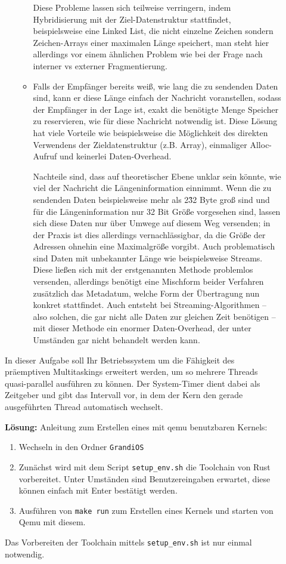\begin{description}
\begin{itemize}
\begin{itemize}
            Diese Probleme lassen sich teilweise verringern, indem Hybridisierung mit der Ziel-Datenstruktur stattfindet, beispielsweise eine Linked List, die nicht einzelne Zeichen sondern Zeichen-Arrays einer maximalen Länge speichert, man steht hier allerdings vor einem ähnlichen Problem wie bei der Frage nach interner vs externer Fragmentierung.
          \item Falls der Empfänger bereits weiß, wie lang die zu sendenden Daten sind, kann er diese Länge einfach der Nachricht voranstellen, sodass der Empfänger in der Lage ist, exakt die benötigte Menge Speicher zu reservieren, wie für diese Nachricht notwendig ist. Diese Lösung hat viele Vorteile wie beispielsweise die Möglichkeit des direkten Verwendens der Zieldatenstruktur (z.B. Array), einmaliger Alloc-Aufruf und keinerlei Daten-Overhead.

            Nachteile sind, dass auf theoretischer Ebene unklar sein könnte, wie viel der Nachricht die Längeninformation einnimmt. Wenn die zu sendenden Daten beispielsweise mehr als 2\^32 Byte groß sind und für die Längeninformation nur 32 Bit Größe vorgesehen sind, lassen sich diese Daten nur über Umwege auf diesem Weg versenden; in der Praxis ist dies allerdings vernachlässigbar, da die Größe der Adressen ohnehin eine Maximalgröße vorgibt. Auch problematisch sind Daten mit unbekannter Länge wie beispielsweise Streams. Diese ließen sich mit der erstgenannten Methode problemlos versenden, allerdings benötigt eine Mischform beider Verfahren zusätzlich das Metadatum, welche Form der Übertragung nun konkret stattfindet. Auch entsteht bei Streaming-Algorithmen -- also solchen, die gar nicht alle Daten zur gleichen Zeit benötigen -- mit dieser Methode ein enormer Daten-Overhead, der unter Umständen gar nicht behandelt werden kann.
        \end{itemize}
    \end{itemize}


In  dieser  Aufgabe  soll  Ihr  Betriebssystem  um  die  Fähigkeit  des  präemptiven  Multitaskings erweitert  werden,  um  so  mehrere  Threads  quasi-parallel  ausführen  zu  können.  Der  System-Timer dient  dabei  als  Zeitgeber  und  gibt  das  Intervall  vor,  in  dem  der  Kern  den  gerade ausgeführten Thread automatisch wechselt. 

\textbf{Lösung:}
Anleitung zum Erstellen eines mit qemu benutzbaren Kernels:
\begin{enumerate}
  \item Wechseln in den Ordner \texttt{GrandiOS}
  \item Zunächst wird mit dem Script \texttt{setup\_env.sh} die Toolchain von Rust vorbereitet. Unter Umständen sind Benutzereingaben erwartet, diese können einfach mit Enter bestätigt werden.
  \item Ausführen von \texttt{make run} zum Erstellen eines Kernels und starten von Qemu mit diesem.
\end{enumerate}
Das Vorbereiten der Toolchain mittels \texttt{setup\_env.sh} ist nur einmal notwendig.


\end{description}
